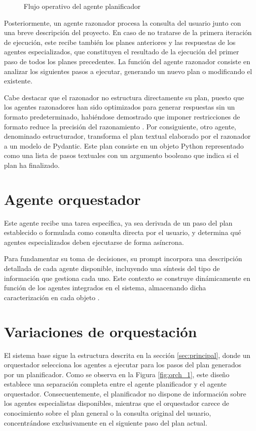 \begin{figure}[h]
\centering
{}
\caption{Flujo operativo del agente planificador}
\label{fig:planner}
\end{figure}
Posteriormente, un agente razonador procesa la consulta del usuario junto con una breve descripción del proyecto. En caso de no tratarse de la primera iteración de ejecución, este recibe también los planes anteriores y las respuestas de los agentes especializados, que constituyen el resultado de la ejecución del primer paso de todos los planes precedentes. La función del agente razonador consiste en analizar los siguientes pasos a ejecutar, generando un nuevo plan o modificando el existente.

Cabe destacar que el razonador no estructura directamente su plan, puesto que los agentes razonadores han sido optimizados para generar respuestas sin un formato predeterminado, habiéndose demostrado que imponer restricciones de formato reduce la precisión del razonamiento \cite{tam_let_2024}. Por consiguiente, otro agente, denominado estructurador, transforma el plan textual elaborado por el razonador a un modelo de Pydantic. Este plan consiste en un objeto Python representado como una lista de pasos textuales con un argumento booleano que indica si el plan ha finalizado.

\section{Agente orquestador}
\label{sec:agente_orquestador}
Este agente recibe una tarea específica, ya sea derivada de un paso del plan establecido o formulada como consulta directa por el usuario, y determina qué agentes especializados deben ejecutarse de forma asíncrona.

Para fundamentar su toma de decisiones, su prompt incorpora una descripción detallada de cada agente disponible, incluyendo una síntesis del tipo de información que gestiona cada uno. Este contexto se construye dinámicamente en función de los agentes integrados en el sistema, almacenando dicha caracterización en cada objeto .

\section{Variaciones de orquestación}
\label{sec:vars}
El sistema base sigue la estructura descrita en la sección \ref{sec:principal}, donde un orquestador selecciona los agentes a ejecutar para los pasos del plan generados por un planificador. Como se observa en la Figura \ref{fig:orch_1}, este diseño establece una separación completa entre el agente planificador y el agente orquestador. Consecuentemente, el planificador no dispone de información sobre los agentes especialistas disponibles, mientras que el orquestador carece de conocimiento sobre el plan general o la consulta original del usuario, concentrándose exclusivamente en el siguiente paso del plan actual.

